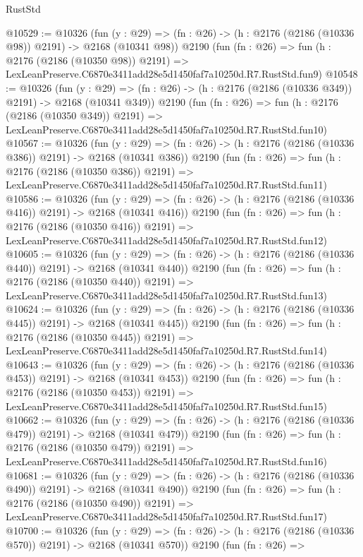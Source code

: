 \begin{lexlean}{RustStd}
\begin{coremodule}
@10529 := @10326
    (fun (y : @29) => (fn : @26) -> (h : @2176 (@2186 (@10336 @98)) @2191) -> @2168 (@10341 @98))
    @2190
    (fun (fn : @26) =>
    fun (h : @2176 (@2186 (@10350 @98)) @2191) =>
    LexLeanPreserve.C6870e3411add28e5d1450faf7a10250d.R7.RustStd.fun9)
@10548 := @10326
    (fun (y : @29) => (fn : @26) -> (h : @2176 (@2186 (@10336 @349)) @2191) -> @2168 (@10341 @349))
    @2190
    (fun (fn : @26) =>
    fun (h : @2176 (@2186 (@10350 @349)) @2191) =>
    LexLeanPreserve.C6870e3411add28e5d1450faf7a10250d.R7.RustStd.fun10)
@10567 := @10326
    (fun (y : @29) => (fn : @26) -> (h : @2176 (@2186 (@10336 @386)) @2191) -> @2168 (@10341 @386))
    @2190
    (fun (fn : @26) =>
    fun (h : @2176 (@2186 (@10350 @386)) @2191) =>
    LexLeanPreserve.C6870e3411add28e5d1450faf7a10250d.R7.RustStd.fun11)
@10586 := @10326
    (fun (y : @29) => (fn : @26) -> (h : @2176 (@2186 (@10336 @416)) @2191) -> @2168 (@10341 @416))
    @2190
    (fun (fn : @26) =>
    fun (h : @2176 (@2186 (@10350 @416)) @2191) =>
    LexLeanPreserve.C6870e3411add28e5d1450faf7a10250d.R7.RustStd.fun12)
@10605 := @10326
    (fun (y : @29) => (fn : @26) -> (h : @2176 (@2186 (@10336 @440)) @2191) -> @2168 (@10341 @440))
    @2190
    (fun (fn : @26) =>
    fun (h : @2176 (@2186 (@10350 @440)) @2191) =>
    LexLeanPreserve.C6870e3411add28e5d1450faf7a10250d.R7.RustStd.fun13)
@10624 := @10326
    (fun (y : @29) => (fn : @26) -> (h : @2176 (@2186 (@10336 @445)) @2191) -> @2168 (@10341 @445))
    @2190
    (fun (fn : @26) =>
    fun (h : @2176 (@2186 (@10350 @445)) @2191) =>
    LexLeanPreserve.C6870e3411add28e5d1450faf7a10250d.R7.RustStd.fun14)
@10643 := @10326
    (fun (y : @29) => (fn : @26) -> (h : @2176 (@2186 (@10336 @453)) @2191) -> @2168 (@10341 @453))
    @2190
    (fun (fn : @26) =>
    fun (h : @2176 (@2186 (@10350 @453)) @2191) =>
    LexLeanPreserve.C6870e3411add28e5d1450faf7a10250d.R7.RustStd.fun15)
@10662 := @10326
    (fun (y : @29) => (fn : @26) -> (h : @2176 (@2186 (@10336 @479)) @2191) -> @2168 (@10341 @479))
    @2190
    (fun (fn : @26) =>
    fun (h : @2176 (@2186 (@10350 @479)) @2191) =>
    LexLeanPreserve.C6870e3411add28e5d1450faf7a10250d.R7.RustStd.fun16)
@10681 := @10326
    (fun (y : @29) => (fn : @26) -> (h : @2176 (@2186 (@10336 @490)) @2191) -> @2168 (@10341 @490))
    @2190
    (fun (fn : @26) =>
    fun (h : @2176 (@2186 (@10350 @490)) @2191) =>
    LexLeanPreserve.C6870e3411add28e5d1450faf7a10250d.R7.RustStd.fun17)
@10700 := @10326
    (fun (y : @29) => (fn : @26) -> (h : @2176 (@2186 (@10336 @570)) @2191) -> @2168 (@10341 @570))
    @2190
    (fun (fn : @26) =>

\end{coremodule}
\end{lexlean}
